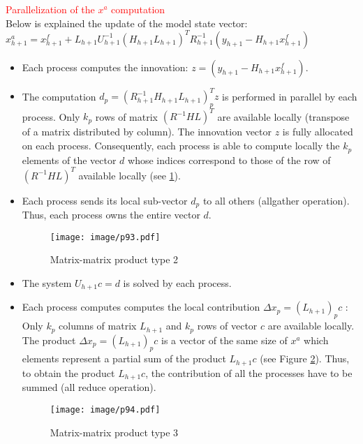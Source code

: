 \documentclass{tufte-book}
\begin{document}
\par \textcolor{red}{Parallelization of the $x^a$ computation}\\

Below is explained the update of the model state vector:\\
$ x_{h+1}^a = x_{h+1}^f + L_{h+1}U_{h+1}^{-1}(H_{h+1}L_{h+1})^T R_{h+1}^{-1} (y_{h+1}-H_{h+1}x_{h+1}^f)$\\


 \begin{itemize}
  \item Each process computes the innovation: $z = (y_{h+1}-H_{h+1}x_{h+1}^f)$.

  \item  The computation $d_p = (R_{h+1}^{-1}H_{h+1}L_{h+1})_p^Tz$  is performed in parallel by each process. Only $k_p$ rows of matrix  $(R^{-1}HL)^T$  are available locally (transpose of a matrix distributed by column). The innovation vector $z$ is fully allocated on each process. Consequently, each process is able to compute locally the $k_p$ elements of the vector $d$ whose indices correspond to those of the row of $(R^{-1}HL)^T$ available locally  (see \ref{matrix_2}).

  \item Each process sends its local sub-vector  $d_p$ to all others (allgather operation). Thus, each process owns the entire vector  $d$.\\

    \begin{figure}[htpb]
        \texttt{[image: image/p93.pdf]}
        \caption{Matrix-matrix product type 2}
        \label{matrix_2}
      \end{figure}

 \item The system  $U_{h+1}c = d$ is solved by each process.

  \item Each process computes computes the local contribution $\Delta x_p = (L_{h+1})_p c$ :\\
  Only $k_p$ columns of matrix $L_{h+1}$ and $k_p$ rows of vector $c$ are available locally. The product $\Delta x_p = (L_{h+1})_p c$ is a vector of the same size of $x^a$ which elements represent a partial sum of the product $L_{h+1} c$ (see Figure \ref{matrix_3}). Thus, to obtain the product  $L_{h+1} c$, the contribution of all the processes have to be summed (all reduce operation).

     \begin{figure}[htpb]
        \texttt{[image: image/p94.pdf]}
        \caption{Matrix-matrix product type 3}
        \label{matrix_3}
\end{figure}



  \end{itemize}
\end{document}
